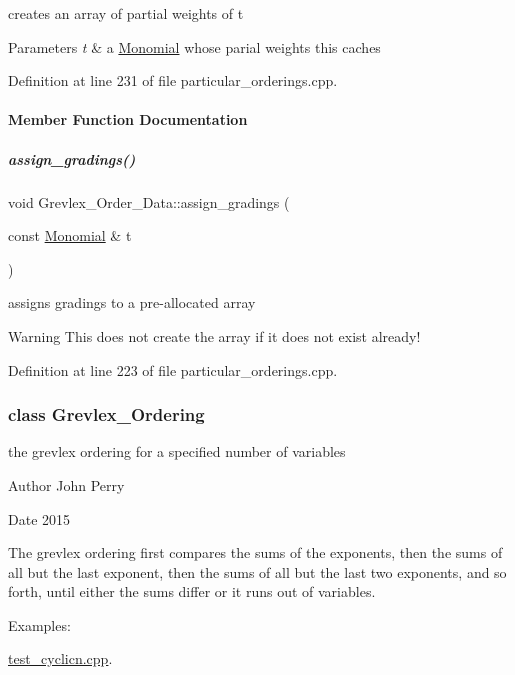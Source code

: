 creates an array of partial weights of {\ttfamily t} 


\begin{DoxyParams}{Parameters}
{\em t} & a \hyperlink{group__polygroup_class_monomial}{Monomial} whose parial weights {\ttfamily this} caches \\
\hline
\end{DoxyParams}


Definition at line 231 of file particular\+\_\+orderings.\+cpp.



\paragraph{Member Function Documentation}
\mbox{\label{group__orderinggroup_aeaf81375ec0b27a6e9c047b1d63c6d55}} 
\subparagraph{\texorpdfstring{assign\+\_\+gradings()}{assign\_gradings()}}
{\footnotesize\ttfamily void Grevlex\+\_\+\+Order\+\_\+\+Data\+::assign\+\_\+gradings (\begin{DoxyParamCaption}\item[{const \hyperlink{group__polygroup_class_monomial}{Monomial} \&}]{t }\end{DoxyParamCaption})}



assigns gradings to a pre-\/allocated array 

\begin{DoxyWarning}{Warning}
This does not create the array if it does not exist already! 
\end{DoxyWarning}


Definition at line 223 of file particular\+\_\+orderings.\+cpp.

\label{class_grevlex___ordering}
\subsubsection{class Grevlex\+\_\+\+Ordering}
the grevlex ordering for a specified number of variables 

\begin{DoxyAuthor}{Author}
John Perry 
\end{DoxyAuthor}
\begin{DoxyDate}{Date}
2015
\end{DoxyDate}
The grevlex ordering first compares the sums of the exponents, then the sums of all but the last exponent, then the sums of all but the last two exponents, and so forth, until either the sums differ or it runs out of variables. \begin{Desc}
\item[Examples\+: ]\par
\hyperlink{test_cyclicn_8cpp-example}{test\+\_\+cyclicn.\+cpp}.\end{Desc}



